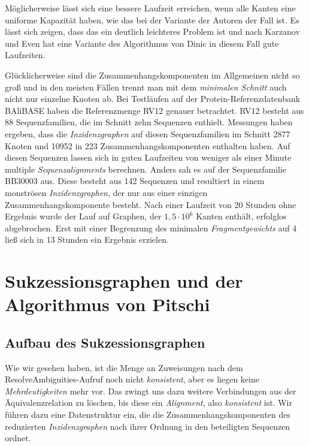 Möglicherweise lässt sich eine bessere Laufzeit erreichen, wenn alle Kanten eine uniforme Kapazität haben, wie das bei der Variante der Autoren der Fall ist. Es lässt sich zeigen, dass das ein deutlich leichteres Problem ist \citep{gt14} und nach Karzanov und Even hat eine Variante des Algorithmus von Dinic in diesem Fall gute Laufzeiten. 

Glücklicherweise sind die Zusammenhangskomponenten im Allgemeinen nicht so groß und in den meisten Fällen trennt man mit dem \emph{minimalen Schnitt} auch nicht nur einzelne Knoten ab. Bei Testläufen auf der Protein-Referenzdatenbank BAliBASE haben \cite{cpm10} die Referenzmenge RV12 genauer betrachtet. RV12 besteht aus 88 Sequenzfamilien, die im Schnitt zehn Sequenzen enthielt. Messungen haben ergeben, dass die \emph{Inzidenzgraphen} auf diesen Sequenzfamilien im Schnitt 2877 Knoten und 10952 in 223 Zusammenhangskomponenten enthalten haben. Auf diesen Sequenzen lassen sich in guten Laufzeiten von weniger als einer Minute multiple \emph{Sequenzalignments} berechnen. Anders sah es auf der Sequenzfamilie BB30003 aus. Diese besteht aus 142 Sequenzen und resultiert in einem monströsen \emph{Inzidenzgraphen}, der nur aus einer einzigen Zusammenhangskomponente besteht. Nach einer Laufzeit von 20 Stunden ohne Ergebnis wurde der Lauf auf Graphen, der $1,5\cdot 10^6$ Kanten enthält, erfolglos abgebrochen. Erst mit einer Begrenzung des minimalen \emph{Fragmentgewichts} auf 4 ließ sich in 13 Stunden ein Ergebnis erzielen. 

\section{Sukzessionsgraphen und der Algorithmus von Pitschi}

\subsection{Aufbau des Sukzessionsgraphen}

Wie wir gesehen haben, ist die Menge an Zuweisungen nach dem \textrm{ResolveAmbiguities}-Aufruf noch nicht \emph{konsistent}, aber es liegen keine \emph{Mehrdeutigkeiten} mehr vor. Das zwingt uns dazu weitere Verbindungen aus der Äquivalenzrelation zu löschen, bis diese ein \emph{Alignment}, also \emph{konsistent} ist. Wir führen dazu eine Datenstruktur ein, die die Zusammenhangskomponenten des reduzierten \emph{Inzidenzgraphen} nach ihrer Ordnung in den beteiligten Sequenzen ordnet.

